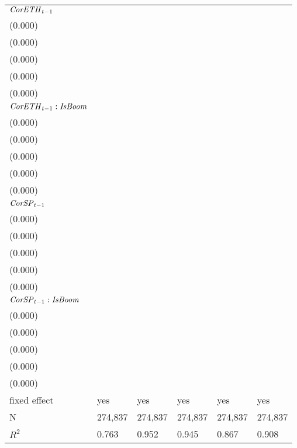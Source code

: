\begin{tabular}{llllll}
${{\it CorETH}}_{t-1}$                      &  \makecell{$-0.000^{***}$ \\ (0.000)} &      \makecell{$0.000^{}$ \\ (0.000)} &      \makecell{$0.000^{}$ \\ (0.000)} &     \makecell{$-0.000^{}$ \\ (0.000)} &   \makecell{$-0.000^{**}$ \\ (0.000)} \\
${{\it CorETH}}_{t-1} : {\it IsBoom}$       &     \makecell{$-0.000^{}$ \\ (0.000)} &      \makecell{$0.000^{}$ \\ (0.000)} &     \makecell{$-0.000^{}$ \\ (0.000)} &   \makecell{$-0.000^{**}$ \\ (0.000)} &   \makecell{$-0.000^{**}$ \\ (0.000)} \\
${{\it CorSP}}_{t-1}$                       &    \makecell{$-0.000^{*}$ \\ (0.000)} &     \makecell{$-0.000^{}$ \\ (0.000)} &     \makecell{$-0.000^{}$ \\ (0.000)} &     \makecell{$-0.000^{}$ \\ (0.000)} &      \makecell{$0.000^{}$ \\ (0.000)} \\
${{\it CorSP}}_{t-1} : {\it IsBoom}$        &    \makecell{$0.001^{**}$ \\ (0.000)} &     \makecell{$-0.000^{}$ \\ (0.000)} &     \makecell{$-0.000^{}$ \\ (0.000)} &   \makecell{$0.000^{***}$ \\ (0.000)} &   \makecell{$0.000^{***}$ \\ (0.000)} \\
\midrule fixed effect                       &                                   yes &                                   yes &                                   yes &                                   yes &                                   yes \\
N                                           &                               274,837 &                               274,837 &                               274,837 &                               274,837 &                               274,837 \\
$R^2$                                       &                                 0.763 &                                 0.952 &                                 0.945 &                                 0.867 &                                 0.908 \\
\bottomrule
\end{tabular}
